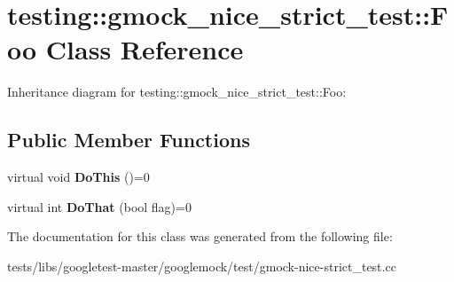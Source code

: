 \hypertarget{classtesting_1_1gmock__nice__strict__test_1_1Foo}{}\section{testing\+:\+:gmock\+\_\+nice\+\_\+strict\+\_\+test\+:\+:Foo Class Reference}
\label{classtesting_1_1gmock__nice__strict__test_1_1Foo}


Inheritance diagram for testing\+:\+:gmock\+\_\+nice\+\_\+strict\+\_\+test\+:\+:Foo\+:
\subsection*{Public Member Functions}
\begin{DoxyCompactItemize}
\item 
\mbox{\label{classtesting_1_1gmock__nice__strict__test_1_1Foo_a79a3cdbd8d9d9f6bc87580563b0d7cec}} 
virtual void {\bfseries Do\+This} ()=0
\item 
\mbox{\label{classtesting_1_1gmock__nice__strict__test_1_1Foo_a8527a459b03f333a809a3376311a9f8b}} 
virtual int {\bfseries Do\+That} (bool flag)=0
\end{DoxyCompactItemize}


The documentation for this class was generated from the following file\+:\begin{DoxyCompactItemize}
\item 
tests/libs/googletest-\/master/googlemock/test/gmock-\/nice-\/strict\+\_\+test.\+cc\end{DoxyCompactItemize}

